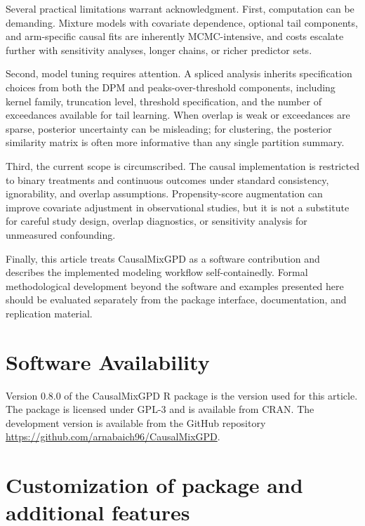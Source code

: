 \documentclass[11pt]{article}\usepackage[]{graphicx}\usepackage[]{xcolor}
\newcommand{\pkg}[1]{\textsf{#1}}
\begin{document}
Several practical limitations warrant acknowledgment.  First,
computation can be demanding.  Mixture models with covariate
dependence, optional tail components, and arm-specific causal fits are
inherently MCMC-intensive, and costs escalate further with sensitivity
analyses, longer chains, or richer predictor sets.

Second, model tuning requires attention.  A spliced analysis inherits
specification choices from both the DPM and peaks-over-threshold
components, including kernel family, truncation level, threshold
specification, and the number of exceedances available for tail
learning.  When overlap is weak or exceedances are sparse, posterior
uncertainty can be misleading; for clustering, the posterior
similarity matrix is often more informative than any single partition
summary.

Third, the current scope is circumscribed.  The causal implementation
is restricted to binary treatments and continuous outcomes under
standard consistency, ignorability, and overlap assumptions.
Propensity-score augmentation can improve covariate adjustment in
observational studies, but it is not a substitute for careful study
design, overlap diagnostics, or sensitivity analysis for unmeasured
confounding.

Finally, this article treats \pkg{CausalMixGPD} as a software
contribution and describes the implemented modeling workflow
self-containedly.  Formal methodological development beyond the
software and examples presented here should be evaluated separately
from the package interface, documentation, and replication material.

\section{Software Availability}
\label{sec:software}

Version 0.8.0 of the \pkg{CausalMixGPD} R package is the version used
for this article. The package is licensed under GPL-3 and is available
from CRAN.
The development version is available from the GitHub repository
\url{https://github.com/arnabaich96/CausalMixGPD}.





\clearpage
\appendix
\section{Customization of package and additional features}
\label{sec:appendix-features}
\end{document}
